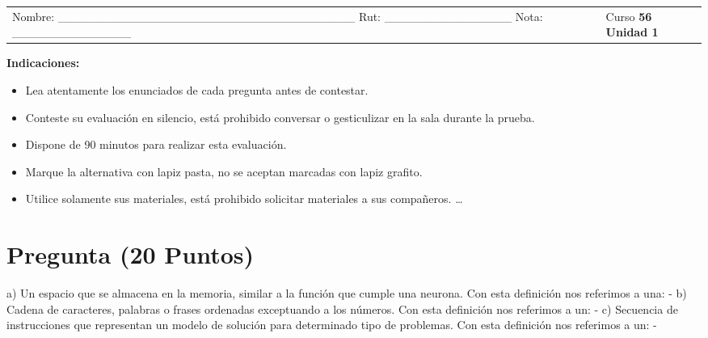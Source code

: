 \documentclass{article}%
\begin{document}
%
\normalsize%
\begin{tabu}{X[l] X[r]}%
\begin{minipage}[h]{0.55\textwidth}%
Nombre: \_\_\_\_\_\_\_\_\_\_\_\_\_\_\_\_\_\_\_\_\_\_\_\_\_\_\_\_\_\_\_\_\_\_\_%
\newline%
%
    Rut:  \_\_\_\_\_\_\_\_\_\_\_\_\_\_\_%
\newline%
%
Nota: \_\_\_\_\_\_\_\_\_\_\_\_\_\_%
\newline%
%
\newline%
%
\end{minipage}&\begin{minipage}[t!]{0.35\textwidth}%
\flushright%
Curso%
\linebreak%
\textbf{56}%
\linebreak%
\textbf{Unidad 1}%
\linebreak%
\linebreak%
\end{minipage}\\%
\end{tabu}%
\begin{Large}%
\textbf{Indicaciones:}%
\end{Large}%
\begin{itemize}%
\linebreak%
\item%
 Lea atentamente los enunciados de cada pregunta antes de contestar.%
\item%
 Conteste su evaluación en silencio, está prohibido conversar o gesticulizar en la sala durante la prueba.%
\item%
 Dispone de 90 minutos para realizar esta evaluación.%
\item%
 Marque la alternativa con lapiz pasta, no se aceptan marcadas con lapiz grafito.%
\item%
 Utilice solamente sus materiales, está prohibido solicitar materiales a sus compañeros.%
\ldots%
\end{itemize}%
\pagestyle{firstpage}%
\section{Pregunta (20 Puntos)}%
\label{sec:Pregunta(20Puntos)}%
a) Un espacio que se almacena en la memoria, similar a la función que cumple una neurona. Con esta definición nos referimos a una:\newline%
\newline%
{-} \newline%
\newline%
b) Cadena de caracteres, palabras o frases ordenadas exceptuando a los números. Con esta definición nos referimos a un:\newline%
\newline%
{-} \newline%
\newline%
c) Secuencia de instrucciones que representan un modelo de solución para determinado tipo de problemas. Con esta definición nos referimos a un:\newline%
\newline%
{-} 

%
\newpage%
\end{document}
